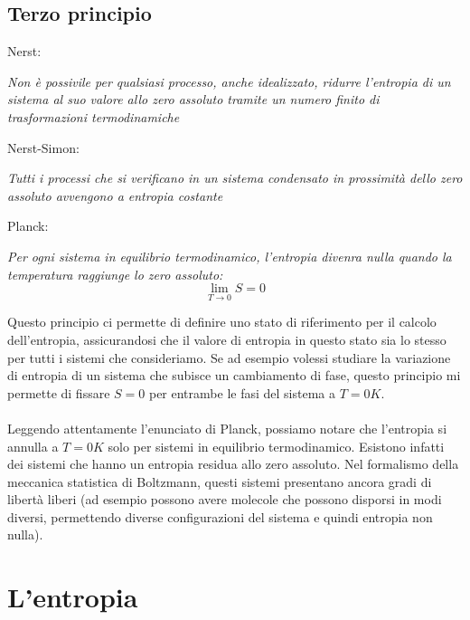 \documentclass{article}
\begin{document}
\subsection{Terzo principio}
Nerst:
\begin{center}
    \textit{Non è possivile per qualsiasi processo, anche idealizzato, ridurre l'entropia di un sistema al suo valore allo zero assoluto tramite un numero finito di trasformazioni termodinamiche}
\end{center}
Nerst-Simon:
\begin{center}
    \textit{Tutti i processi che si verificano in un sistema condensato in prossimità dello zero assoluto avvengono a entropia costante}
\end{center}
Planck:
\begin{center}
    \textit{Per ogni sistema in equilibrio termodinamico, l'entropia divenra nulla quando la temperatura raggiunge lo zero assoluto:}
    $$ \lim_{T\rightarrow0}S=0 $$
\end{center}
Questo principio ci permette di definire uno stato di riferimento per il calcolo dell'entropia, assicurandosi che il valore di entropia in questo stato sia lo stesso per tutti i sistemi che consideriamo. Se ad esempio volessi studiare la variazione di entropia di un sistema che subisce un cambiamento di fase, questo principio mi permette di fissare $S=0$ per entrambe le fasi del sistema a $T=0K$.\\\\
Leggendo attentamente l'enunciato di Planck, possiamo notare che l'entropia si annulla a $T=0K$ solo per sistemi in equilibrio termodinamico. Esistono infatti dei sistemi che hanno un entropia residua allo zero assoluto. Nel formalismo della meccanica statistica di Boltzmann, questi sistemi presentano ancora gradi di libertà liberi (ad esempio possono avere molecole che possono disporsi in modi diversi, permettendo diverse configurazioni del sistema e quindi entropia non nulla).



\newpage
\section{L'entropia}
\end{document}
